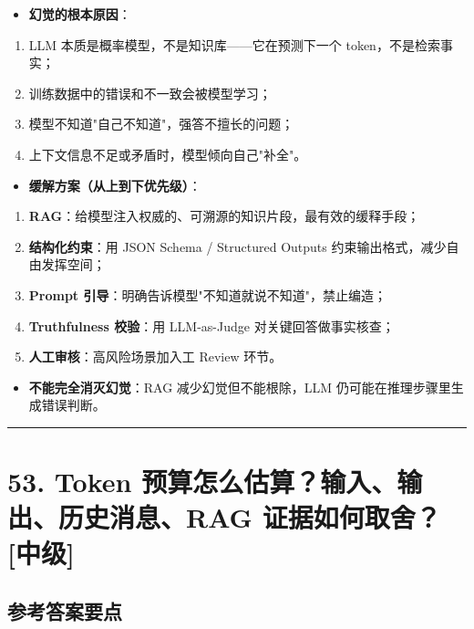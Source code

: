 \documentclass[9pt,a4paper,twocolumn]{ctexart}
\newcommand{\lvzhong}{\usebox{\badgezhongbox}}
\def\lvzhong{[中级]}%
\begin{document}
\begin{itemize}[itemsep=1pt, topsep=2pt]
  \item \textbf{幻觉的根本原因}：
\end{itemize}
\begin{enumerate}[itemsep=1pt, topsep=2pt]
  \item LLM 本质是概率模型，不是知识库——它在预测下一个 token，不是检索事实；
  \item 训练数据中的错误和不一致会被模型学习；
  \item 模型不知道"自己不知道"，强答不擅长的问题；
  \item 上下文信息不足或矛盾时，模型倾向自己"补全"。
\end{enumerate}
\begin{itemize}[itemsep=1pt, topsep=2pt]
  \item \textbf{缓解方案（从上到下优先级）}：
\end{itemize}
\begin{enumerate}[itemsep=1pt, topsep=2pt]
  \item \textbf{RAG}：给模型注入权威的、可溯源的知识片段，最有效的缓释手段；
  \item \textbf{结构化约束}：用 JSON Schema / Structured Outputs 约束输出格式，减少自由发挥空间；
  \item \textbf{Prompt 引导}：明确告诉模型"不知道就说不知道"，禁止编造；
  \item \textbf{Truthfulness 校验}：用 LLM-as-Judge 对关键回答做事实核查；
  \item \textbf{人工审核}：高风险场景加入工 Review 环节。
\end{enumerate}
\begin{itemize}[itemsep=1pt, topsep=2pt]
  \item \textbf{不能完全消灭幻觉}：RAG 减少幻觉但不能根除，LLM 仍可能在推理步骤里生成错误判断。
\end{itemize}


\vspace{2pt}
\noindent\rule{\columnwidth}{0.3pt}\vspace{2pt}



\section*{53. Token 预算怎么估算？输入、输出、历史消息、RAG 证据如何取舍？ \lvzhong{}}


\subsection*{参考答案要点}
\end{document}
